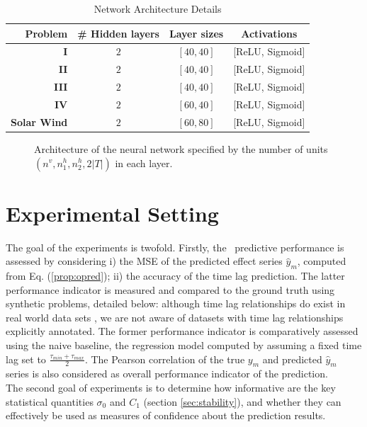 \begin{table}[htbp]
  \caption{Network Architecture Details}\label{tab:arch_probs}
  \centering
  \begin{tabular}{ r c c c }
  \hline
  Problem &  \# Hidden layers & Layer sizes & Activations\\
  \hline
  \textbf{I} & $2$ & $[40, 40]$  & [ReLU, Sigmoid]\\
  \textbf{II} & $2$ & $[40, 40]$ & [ReLU, Sigmoid]\\
  \textbf{III} & $2$ & $[40, 40]$ & [ReLU, Sigmoid]\\
  \textbf{IV} & $2$ & $[60, 40]$ & [ReLU, Sigmoid]\\
  \textbf{Solar Wind} & $2$ & $[60, 80]$ & [ReLU, Sigmoid]\\
  \hline
  \end{tabular}
  \label{tab:exp}
\end{table}


\begin{figure}[ht]
\centerline{\resizebox*{0.7\textwidth}{!}{}}
\caption{\label{fig:archi} Architecture of the neural network specified by the number of units 
$(n^v,n_1^h,n_2^h,2\vert T\vert)$ in each layer.}
\label{fig:NN}
\end{figure}

\section{Experimental Setting}\label{sec:pdtExp}

The goal of the experiments is twofold. Firstly, the \XX\ predictive performance is assessed by considering i) the MSE of the predicted effect series $\hat y_m$, computed from Eq. (\ref{prop:opred}); 
ii) the accuracy of the time lag prediction. The latter performance indicator is measured and compared to the ground truth using synthetic problems, detailed below: although time lag relationships do exist in real world data sets \citep{doi:10.1002/jgra.50429,ZHOU2006195}, we are not aware of datasets with time lag relationships explicitly annotated. The former performance indicator is comparatively assessed using the naive baseline, the regression model computed by assuming a fixed time lag set to $\frac{\tau_{min}+\tau_{max}}{2}$. The Pearson correlation of the true $y_m$ and predicted $\hat y_m$ series is also considered as overall performance indicator of the prediction.\\
The second goal of experiments is to determine how informative are the key statistical quantities $\sigma_0$ and $C_1$ (section \ref{sec:stability}), and whether they can effectively be used as measures of confidence about the prediction results. 

